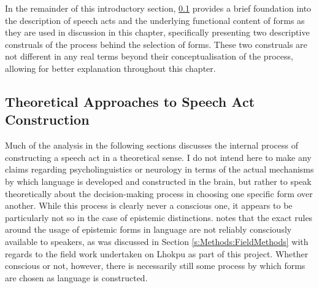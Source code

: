 In the remainder of this introductory section, \ref{ss:Discussion:SpeechActs} provides a brief foundation into the description of speech acts and the underlying functional content of forms as they are used in discussion in this chapter, specifically presenting two descriptive construals of the process behind the selection of forms. These two construals are not different in any real terms beyond their conceptualisation of the process, allowing for better explanation throughout this chapter.

\subsection{Theoretical Approaches to Speech Act Construction}\label{ss:Discussion:SpeechActs}
Much of the analysis in the following sections discusses the internal process of constructing a speech act in a theoretical sense. I do not intend here to make any claims regarding psycholinguistics or neurology in terms of the actual mechanisms by which language is developed and constructed in the brain, but rather to speak theoretically about the decision-making process in choosing one specific form over another. While this process is clearly never a conscious one, it appears to be particularly not so in the case of epistemic distinctions.  notes that the exact rules around the usage of epistemic forms in language are not reliably consciously available to speakers, as was discussed in Section \ref{s:Methods:FieldMethods} with regards to the field work undertaken on Lhokpu as part of this project. Whether conscious or not, however, there is necessarily still some process by which forms are chosen as language is constructed.

